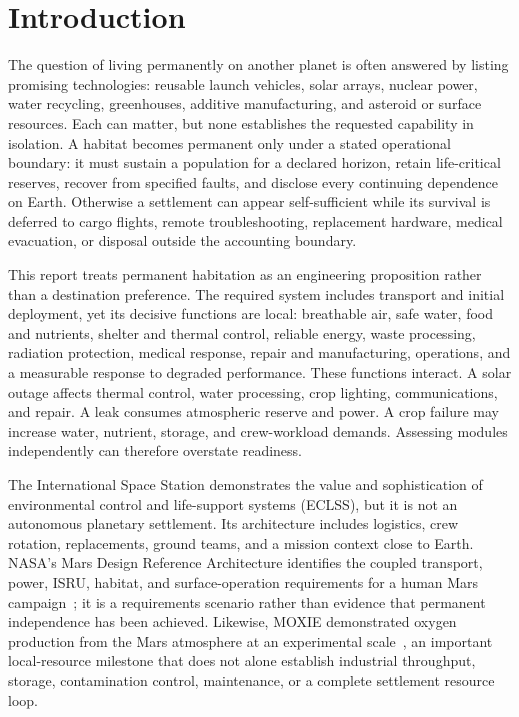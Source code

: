 \documentclass[10pt,conference]{IEEEtran}
\begin{document}
\section{Introduction}
\label{sec:introduction}

The question of living permanently on another planet is often answered by listing promising technologies: reusable launch vehicles, solar arrays, nuclear power, water recycling, greenhouses, additive manufacturing, and asteroid or surface resources. Each can matter, but none establishes the requested capability in isolation. A habitat becomes permanent only under a stated operational boundary: it must sustain a population for a declared horizon, retain life-critical reserves, recover from specified faults, and disclose every continuing dependence on Earth. Otherwise a settlement can appear self-sufficient while its survival is deferred to cargo flights, remote troubleshooting, replacement hardware, medical evacuation, or disposal outside the accounting boundary.

This report treats permanent habitation as an engineering proposition rather than a destination preference. The required system includes transport and initial deployment, yet its decisive functions are local: breathable air, safe water, food and nutrients, shelter and thermal control, reliable energy, waste processing, radiation protection, medical response, repair and manufacturing, operations, and a measurable response to degraded performance. These functions interact. A solar outage affects thermal control, water processing, crop lighting, communications, and repair. A leak consumes atmospheric reserve and power. A crop failure may increase water, nutrient, storage, and crew-workload demands. Assessing modules independently can therefore overstate readiness.

The International Space Station demonstrates the value and sophistication of environmental control and life-support systems (ECLSS), but it is not an autonomous planetary settlement. Its architecture includes logistics, crew rotation, replacements, ground teams, and a mission context close to Earth. NASA's Mars Design Reference Architecture identifies the coupled transport, power, ISRU, habitat, and surface-operation requirements for a human Mars campaign~\cite{hoffmanprice2009}; it is a requirements scenario rather than evidence that permanent independence has been achieved. Likewise, MOXIE demonstrated oxygen production from the Mars atmosphere at an experimental scale~\cite{hecht2021}, an important local-resource milestone that does not alone establish industrial throughput, storage, contamination control, maintenance, or a complete settlement resource loop.
\end{document}

